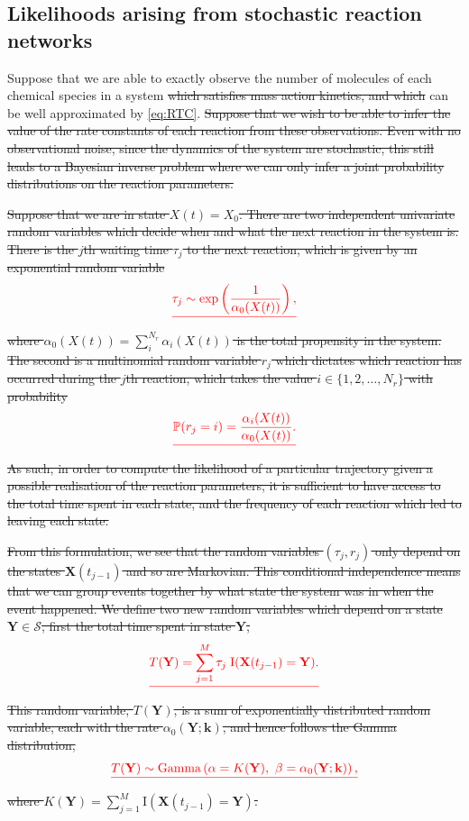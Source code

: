 \documentclass[final]{siamltex}
\providecommand{\DIFadd}[1]{{\protect\color{blue}\uwave{#1}}} %
\providecommand{\DIFdel}[1]{{\protect\color{red}\sout{#1}}}                      %
\providecommand{\DIFaddbegin}{} %
\providecommand{\DIFaddend}{} %
\providecommand{\DIFdelbegin}{} %
\providecommand{\DIFdelend}{} %
\newcommand{\DIFscaledelfig}{0.5}
\newlength{\DIFdelgraphicswidth} %
\newlength{\DIFdelgraphicsheight} %
\newcommand{\DIFaddincludegraphics}[2][]{{\color{blue}\fbox{\DIFOincludegraphics[#1]{#2}}}} %
\newcommand{\DIFdelincludegraphics}[2][]{%
\sbox{\DIFdelgraphicsbox}{\DIFOincludegraphics[#1]{#2}}%
\settoboxwidth{\DIFdelgraphicswidth}{\DIFdelgraphicsbox} %
\settoboxtotalheight{\DIFdelgraphicsheight}{\DIFdelgraphicsbox} %
\scalebox{\DIFscaledelfig}{%
\parbox[b]{\DIFdelgraphicswidth}{\usebox{\DIFdelgraphicsbox}\\[-\baselineskip] \rule{\DIFdelgraphicswidth}{0em}}\llap{\resizebox{\DIFdelgraphicswidth}{\DIFdelgraphicsheight}{%
\setlength{\unitlength}{\DIFdelgraphicswidth}%
\begin{picture}(1,1)%
\thicklines\linethickness{2pt} %
{\color[rgb]{1,0,0}\put(0,0){\framebox(1,1){}}}%
{\color[rgb]{1,0,0}\put(0,0){\line( 1,1){1}}}%
{\color[rgb]{1,0,0}\put(0,1){\line(1,-1){1}}}%
\end{picture}%
}\hspace*{3pt}}} %
} %
\DeclareRobustCommand{\DIFaddbegin}{\DIFOaddbegin \let\includegraphics\DIFaddincludegraphics} %
\DeclareRobustCommand{\DIFaddend}{\DIFOaddend \let\includegraphics\DIFOincludegraphics} %
\DeclareRobustCommand{\DIFdelbegin}{\DIFOdelbegin \let\includegraphics\DIFdelincludegraphics} %
\DeclareRobustCommand{\DIFdelend}{\DIFOaddend \let\includegraphics\DIFOincludegraphics} %
\begin{document}
\subsection{Likelihoods arising from \DIFaddbegin \DIFadd{multiscale }\DIFaddend stochastic reaction networks}
Suppose that we are able to exactly observe the number of molecules of
each chemical species in a system \DIFdelbegin \DIFdel{which satisfies mass action
kinetics, and which }\DIFdelend \DIFaddbegin \DIFadd{that }\DIFaddend can be well approximated by
\eqref{eq:RTC}. \DIFdelbegin \DIFdel{Suppose that we wish to be able to infer the value of
the rate constants of each reaction from these observations. Even with no observational noise, since the dynamics
of the system are stochastic, this still leads to a Bayesian inverse
problem where we can only infer a joint probability distributions on the
reaction parameters.
}%

\DIFdel{Suppose that we are in state $X(t) = X_0$. There are two independent
univariate random variables which decide when and what the next
reaction in the system is. There is the $j$th waiting time $\tau_j$ to the
next reaction, which is given by an exponential random variable
}\[\DIFdel{\tau_j \sim \exp \left ( \frac{1}{\alpha_0(X(t))} \right ),}\]
\DIFdel{where $\alpha_0(X(t)) =\sum_{i}^{N_r} \alpha_i(X(t))$ is the total
propensity in the system. The second is a multinomial random variable $r_j$
which dictates which reaction has occurred during the $j$th reaction,
which takes the value
$i \in \{1,2,\ldots,N_r\}$ with probability
}\[\DIFdel{\mathbb{P}(r_j = i) = \frac{\alpha_i(X(t))}{\alpha_0(X(t))}.}\]
\DIFdel{As such, in order to compute the likelihood of a particular trajectory
given a possible realisation of the reaction parameters, it is
sufficient to have access to the total time spent in each state, and
the frequency of each reaction which led to leaving each state.
}%

\DIFdel{From this formulation, we see that the random variables $(\tau_j, r_j)$ only depend on the states $\mathbf{X}(t_{j-1})$ and so are Markovian. This conditional independence means that we can group events together by what state the system was in when the event happened. We define two new random variables which depend on a state $\mathbf{Y} \in \mathcal{S}$, first the total time spent in state $\mathbf{Y}$,
}\[
	\DIFdel{T(\mathbf{Y}) = \sum\limits_{j=1}^M \tau_j\; \text{I}(\mathbf{X}(t_{j-1}) = \mathbf{Y}).
}\]
\DIFdel{This random variable, $T(\mathbf{Y})$, is a sum of exponentially
distributed random variable, each with the rate $\alpha_0(\mathbf{Y};\mathbf{k})$, and hence follows the Gamma distribution,
}\begin{displaymath}\DIFdel{\label{eqn:chem_time_dist}
	T(\mathbf{Y}) \sim \text{Gamma}\left(\alpha=K(\mathbf{Y}),~\beta = \alpha_0(\mathbf{Y}; \mathbf{k})\right),
}\end{displaymath}
\DIFdel{where $K(\mathbf{Y}) = \sum\limits_{j=1}^M \text{I}(\mathbf{X}(t_{j-1}) = \mathbf{Y})$.
}%
\end{document}
